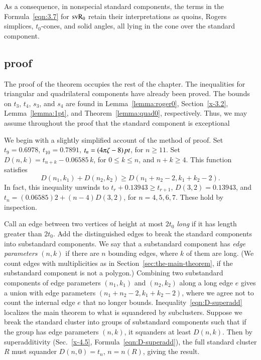 As a consequence, in nonspecial standard components, the terms in the
Formula~\ref{eqn:3.7} for ${\operatorname{svR}}_0$ retain their interpretations as
quoins, Rogers simplices, $t_0$-cones, and solid angles, all lying
in the cone over the standard component.


\subsection{proof} %

The proof of the theorem occupies the rest of the chapter. The
inequalities for triangular and quadrilateral components have already
been proved. The bounds on $t_3$, $t_4$, $s_3$, and $s_4$ are
found in Lemma~\ref{lemma:roger0}, Section~\ref{x-3.2},
Lemma~\ref{lemma:1pt}, and Theorem~\ref{lemma:quad0},
respectively. Thus, we may assume throughout the proof that the
standard component is exceptional

We begin with a slightly simplified account of the method of
proof. Set $t_9=0.6978$, $t_{10}= 0.7891$, $t_n=(4\pi\zeta-8)\,\hbox{\it pt}$, for
$n\ge 11$. Set $D(n,k) = t_{n+k} - 0.06585\,k$, for $0\le k\le n$,
and $n+k\ge 4$. This function satisfies
    \begin{equation}
    D(n_1,k_1)+D(n_2,k_2)\ge D(n_1+n_2-2,k_1+k_2-2).
    \label{eqn:D-superadd}
    \end{equation}
In fact, this inequality unwinds to $t_r+0.13943\ge t_{r+1}$,
$D(3,2)=0.13943$, and $t_n =(0.06585)2+(n-4)D(3,2)$, for $n=4,5,6,7$.
These hold  by inspection.

Call an edge between two vertices of height at most $2t_0$ {\it long\/}
if it has length greater than $2t_0$. Add the distinguished edges to
break the standard components into substandard components. We say that a substandard component has
{\it edge parameters} $(n,k)$ if there are $n$ bounding edges, where $k$
of them are long. (We count edges with multiplicities as in
Section~\ref{sec:the-main-theorem}, if the substandard component is not a polygon.)
Combining two substandard components of edge parameters $(n_1,k_1)$ and $(n_2,k_2)$
along a long edge $e$ gives a union with edge parameters
$(n_1+n_2-2,k_1+k_2-2)$, where we agree not to count the internal edge
$e$ that no longer bounds. Inequality~\ref{eqn:D-superadd} localizes the
main theorem to what is squandered by subclusters. Suppose we break the
standard cluster into groups of substandard components such that if the group has
edge parameters $(n,k)$, it squanders at least $D(n,k)$. Then by
superadditivity (Sec.~\ref{x-4.5}, Formula~\ref{eqn:D-superadd}), the
full standard cluster $R$ must squander $D(n,0) = t_n$, $n=n(R)$, giving
the result.

